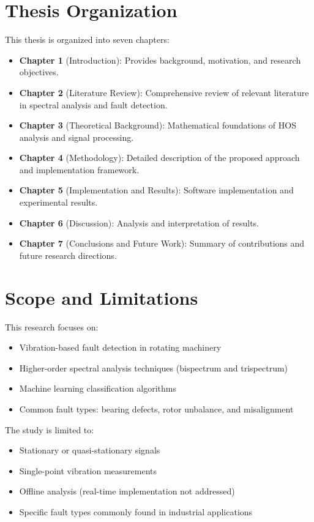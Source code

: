 \section{Thesis Organization}

This thesis is organized into seven chapters:

\begin{itemize}
    \item \textbf{Chapter 1} (Introduction): Provides background, motivation, and research objectives.
    \item \textbf{Chapter 2} (Literature Review): Comprehensive review of relevant literature in spectral analysis and fault detection.
    \item \textbf{Chapter 3} (Theoretical Background): Mathematical foundations of HOS analysis and signal processing.
    \item \textbf{Chapter 4} (Methodology): Detailed description of the proposed approach and implementation framework.
    \item \textbf{Chapter 5} (Implementation and Results): Software implementation and experimental results.
    \item \textbf{Chapter 6} (Discussion): Analysis and interpretation of results.
    \item \textbf{Chapter 7} (Conclusions and Future Work): Summary of contributions and future research directions.
\end{itemize}

\section{Scope and Limitations}

This research focuses on:

\begin{itemize}
    \item Vibration-based fault detection in rotating machinery
    \item Higher-order spectral analysis techniques (bispectrum and trispectrum)
    \item Machine learning classification algorithms
    \item Common fault types: bearing defects, rotor unbalance, and misalignment
\end{itemize}

The study is limited to:

\begin{itemize}
    \item Stationary or quasi-stationary signals
    \item Single-point vibration measurements
    \item Offline analysis (real-time implementation not addressed)
    \item Specific fault types commonly found in industrial applications
\end{itemize}
